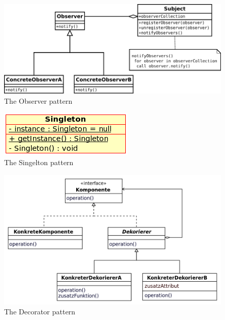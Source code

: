 \documentclass[../main/main.tex]{subfiles}
\begin{document}
\begin{figure}
  \includegraphics{../figures/observer.png}  
  \caption{The Observer pattern}
  \label{fig:observer}
\end{figure}

\begin{figure}
  \includegraphics{../figures/singelton.png}  
  \caption{The Singelton pattern}
  \label{fig:singelton}
\end{figure}

\begin{figure}
  \includegraphics{../figures/decorator.png}  
  \caption{The Decorator pattern}
  \label{fig:decorator}
\end{figure}


\end{document}
